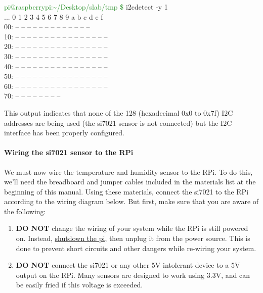 \documentclass{article}
\newcommand*{\myfont}{\fontfamily{pcr}\selectfont}
\newcommand{\outputb}[2]{
  \begin{tcolorbox}[width=\textwidth,colback={light-gray},title={#1},colbacktitle=gray,coltitle=light-gray]
    \myfont
    #2
  \end{tcolorbox}
} %
\begin{document}
    \outputb{I2C interface detection output (si7021 \textbf{NOT} wired)}
    {
      \textcolor{ForestGreen}{pi@raspberrypi:\textasciitilde/Desktop/slab/tmp \$} i2cdetect -y 1 \\
    ...       0  1  2  3  4  5  6  7  8  9  a  b  c  d  e  f \\
      00:          -- -- -- -- -- -- -- -- -- -- -- -- -- \\
      10: -- -- -- -- -- -- -- -- -- -- -- -- -- -- -- -- \\
      20: -- -- -- -- -- -- -- -- -- -- -- -- -- -- -- -- \\
      30: -- -- -- -- -- -- -- -- -- -- -- -- -- -- -- -- \\
      40: -- -- -- -- -- -- -- -- -- -- -- -- -- -- -- -- \\
      50: -- -- -- -- -- -- -- -- -- -- -- -- -- -- -- -- \\
      60: -- -- -- -- -- -- -- -- -- -- -- -- -- -- -- -- \\
      70: -- -- -- -- -- -- -- --
    }

    This output indicates that none of the 128 (hexadecimal 0x0 to 0x7f) I2C addresses are being used (the si7021 sensor is not connected) but the I2C interface has been properly configured.

  \paragraph{Wiring the si7021 sensor to the RPi}
  We must now wire the temperature and humidity sensor to the RPi. To do this, we'll need the breadboard and jumper cables included in the materials list at the beginning of this manual. Using these materials, connect the si7021 to the RPi according to the wiring diagram below. But first, make sure that you are aware of the following:
  \begin{enumerate}
    \item \textbf{DO NOT} change the wiring of your system while the RPi is still powered on. Instead, \hyperref[sec:shutting-down]{shutdown the pi}, then unplug it from the power source. This is done to prevent short circuits and other dangers while re-wiring your system.
    \item \textbf{DO NOT} connect the si7021 or any other 5V intolerant device to a 5V output on the RPi. Many sensors are designed to work using 3.3V, and can be easily fried if this voltage is exceeded.
  \end{enumerate}
\end{document}
